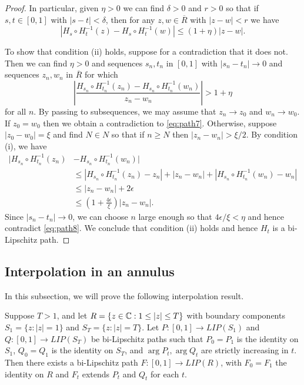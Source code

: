 \documentclass{amsart}
\begin{document}
\begin{proof}
In particular, given $\eta >0$ we can find $\delta>0$ and $r>0$ so that if $s,t \in [0,1]$ with $|s-t| < \delta $, then for any $z,w \in \overline{R}$ with $|z-w| < r$ we have
\begin{equation}
\label{eq:path7}
|H_s\circ H_t^{-1} (z) - H_s\circ H_t^{-1} (w) | \leq (1+\eta) |z-w|.
\end{equation}

To show that condition (ii) holds, suppose for a contradiction that it does not. Then we can find $\eta >0$ and sequences $s_n,t_n$ in $[0,1]$ with $|s_n-t_n| \to 0$ and sequences $z_n,w_n$ in $\overline{R}$ for which
\begin{equation}
\label{eq:path8}
\left | \frac{ H_{s_n} \circ H_{t_n}^{-1} (z_n) -  H_{s_n} \circ H_{t_n}^{-1} (w_n) }{z_n-w_n} \right | > 1+\eta
\end{equation}
for all $n$.
By passing to subsequences, we may assume that $z_n \to z_0$ and $w_n \to w_0$. If $z_0 = w_0$ then we obtain a contradiction to \eqref{eq:path7}. Otherwise, suppose $|z_0 - w_0| = \xi$ and find $N\in N$ so that if $n\geq N$ then $|z_n - w_n| >\xi/2$.
By condition (i), we have
\begin{align*}
|H_{s_n} \circ H_{t_n}^{-1} (z_n) &-  H_{s_n} \circ H_{t_n}^{-1} (w_n) | \\
&\leq
|H_{s_n} \circ H_{t_n}^{-1} (z_n)  - z_n| + |z_n - w_n| + |H_{s_n} \circ H_{t_n}^{-1} (w_n) -w_n | \\
& \leq |z_n-w_n| + 2\epsilon \\
&\leq (1+\frac{4\epsilon}{\xi}) |z_n-w_n|.
\end{align*}
Since $|s_n-t_n| \to 0$, we can choose $n$ large enough so that $4\epsilon /\xi <\eta$ and hence contradict \eqref{eq:path8}.
We conclude that condition (ii) holds and hence $H_t$ is a bi-Lipschitz path.
\end{proof}



\subsection{Interpolation in an annulus}

In this subsection, we will prove the following interpolation result.

\begin{proposition}
\label{prop:interp}
Suppose $T>1$, and let $R=\{z\in \mathbb{C} : 1\leq |z| \leq T \}$ with boundary components $S_1 = \{z : |z|=1 \}$ and $S_T = \{ z : |z| = T \}$. Let $P: [0,1] \to LIP(S_1)$ and $Q:[0,1] \to LIP(S_T)$ be bi-Lipschitz paths such that $P_0 = P_1$ is the identity on $S_1$, $Q_0 = Q_1$ is the identity on $S_T$, and $\arg P_t, \arg Q_t$ are strictly increasing in $t$. Then there exists a bi-Lipschitz path $F:[0,1] \to LIP(R)$, with $F_0 =F_1$ the identity on $R$ and $F_t$ extends $P_t$ and $Q_t$ for each $t$.
\end{proposition}
\end{document}
